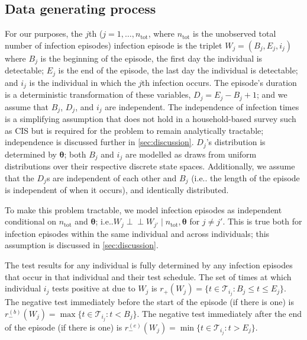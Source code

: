 \documentclass[referee,useAMS,usenatbib]{biom}
\makeatletter
\newcommand{\ind}{\mathrel{\perp\!\!\!\perp}}
\renewcommand{\vec}[1]{\bm{#1}}
\newcommand{\ssep}{:}
\newcommand{\ntot}{n_\text{tot}}
\newcommand{\sched}{\mathcal{T}}
\newcommand{\posResults}{r_{+}}
\newcommand{\negResults}{r_{-}}
\DeclareRobustCommand\onedot{\futurelet\@let@token\@onedot}
\def\@onedot{\ifx\@let@token.\else.\null\fi\xspace}
\def\ie{i.e\onedot} \def\Ie{{I.e}\onedot}
\makeatother
\begin{document}
\subsection{Data generating process}

For our purposes, the $j$th ($j = 1, \dots, \ntot$, where $\ntot$ is the unobserved total number of infection episodes) infection episode is the triplet $W_j = (B_j, E_j, i_j)$ where $B_j$ is the beginning of the episode, the first day the individual is detectable; $E_j$ is the end of the episode, the last day the individual is detectable; and $i_j$ is the individual in which the $j$th infection occurs.
The episode's duration is a deterministic transformation of these variables, $D_j = E_j - B_j + 1$; and we assume that $B_j$, $D_j$, and $i_j$ are independent.
The independence of infection times is a simplifying assumption that does not hold in a household-based survey such as CIS but is required for the problem to remain analytically tractable; independence is discussed further in \cref{sec:discussion}.
$D_j$'s distribution is determined by $\vec{\theta}$; both $B_j$ and $i_j$ are modelled as draws from uniform distributions over their respective discrete state spaces.
Additionally, we assume that the $D_j$s are independent of each other and $B_j$ (\ie the length of the episode is independent of when it occurs), and identically distributed.


To make this problem tractable, we model infection episodes as independent conditional on $\ntot$ and $\vec{\theta}$; \ie $W_j \ind W_{j'} \mid \ntot, \vec{\theta}$ for $j \neq j'$.
This is true both for infection episodes within the same individual and across individuals; this assumption is discussed in \cref{sec:discussion}.

The test results for any individual is fully determined by any infection episodes that occur in that individual and their test schedule.
The set of times at which individual $i_j$ tests positive at due to $W_j$ is $\posResults(W_j) = \{ t \in \sched_{i_j} \ssep B_j \leq t \leq E_j \}$.
The negative test immediately before the start of the episode (if there is one) is $\negResults^{(b)}(W_j) = \max \{ t \in \sched_{i_j} \ssep t < B_j \}$.
The negative test immediately after the end of the episode (if there is one) is $\negResults^{(e)}(W_j) = \min \{ t \in \sched_{i_j} \ssep t > E_j \}$.
\end{document}
